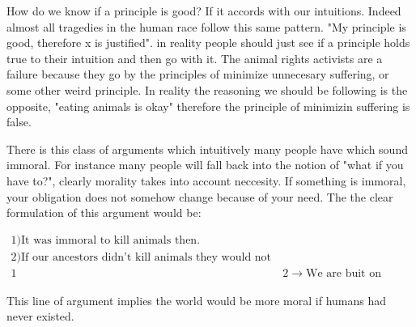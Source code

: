 How do we know if a principle is good? If it accords with our intuitions. Indeed almost all tragedies in the human race follow this same pattern. "My principle is good, therefore x is justified". in reality people should just see if a principle holds true to their intuition and then go with it. The animal rights activists are a failure because they go by the principles of minimize unnecesary suffering, or some other weird principle. In reality the reasoning we should be following is the opposite, "eating animals is okay" therefore the principle of minimizin suffering is false. 

There is this class of arguments which intuitively many people have which sound immoral. For instance many people will fall back into the notion of "what if you have to?", clearly morality takes into account neccesity. If something is immoral, your obligation does not somehow change because of your need. The the clear formulation of this argument would be:

\begin{align}
1) \text{It was immoral to kill animals then.} \\
2) \text{If our ancestors didn't kill animals they would not have evolved as they did} \\
1&2 \rightarrow \text{We are buit on immorality}
\end{align}

This line of argument implies the world would be more moral if humans had never existed. 